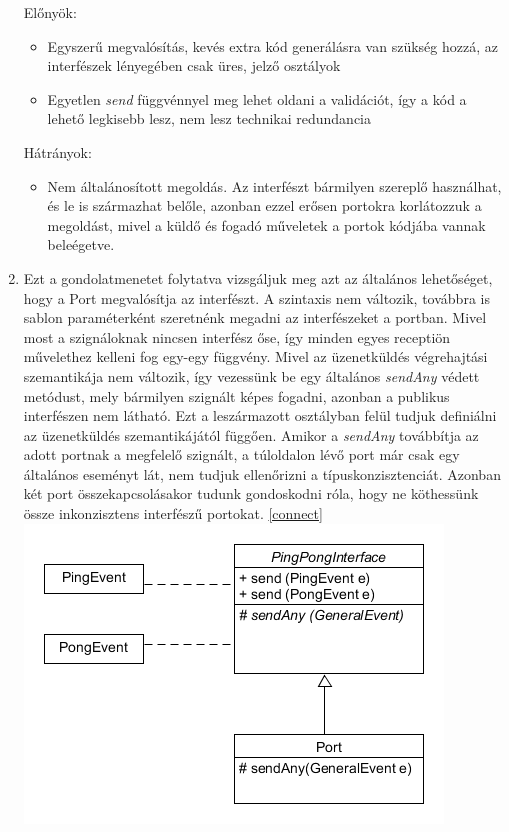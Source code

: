 \documentclass[a4paper,12pt]{report}
\begin{document}
\begin{enumerate}
Előnyök:
\begin{itemize}
\item Egyszerű megvalósítás, kevés extra kód generálásra van szükség hozzá, az interfészek lényegében csak üres, jelző osztályok
\item Egyetlen \textit{send} függvénnyel meg lehet oldani a validációt, így a kód a lehető legkisebb lesz, nem lesz technikai redundancia
\end{itemize}
Hátrányok:
\begin{itemize}
\item Nem általánosított megoldás. Az interfészt bármilyen szereplő használhat, és le is származhat belőle, azonban ezzel erősen portokra korlátozzuk a megoldást, mivel a küldő és fogadó műveletek a portok kódjába vannak beleégetve.
\end{itemize}
\item Ezt a gondolatmenetet folytatva vizsgáljuk meg azt az általános lehetőséget, hogy a Port megvalósítja az interfészt. A szintaxis nem változik, továbbra is sablon paraméterként szeretnénk megadni az interfészeket a portban. Mivel most a szignáloknak nincsen interfész őse, így minden egyes receptiön művelethez kelleni fog egy-egy függvény. Mivel az üzenetküldés végrehajtási szemantikája nem változik, így vezessünk be egy általános \textit{sendAny} védett metódust, mely bármilyen szignált képes fogadni, azonban a publikus interfészen nem látható. Ezt a leszármazott osztályban felül tudjuk definiálni az üzenetküldés szemantikájától függően. Amikor a \textit{sendAny} továbbítja az adott portnak a megfelelő szignált, a túloldalon lévő port már csak egy általános eseményt lát, nem tudjuk ellenőrizni a típuskonzisztenciát. Azonban két port összekapcsolásakor tudunk gondoskodni róla, hogy ne köthessünk össze inkonzisztens interfészű portokat. \ref{connect} \\
\includegraphics[scale=0.7]{inf_ver2.png} \\

\end{enumerate}
\end{document}
